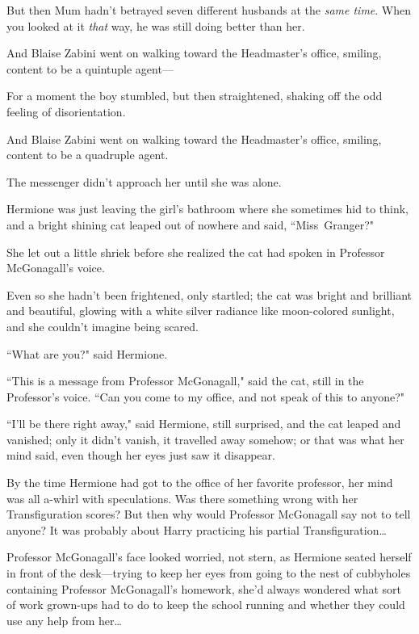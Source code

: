 But then Mum hadn't betrayed seven different husbands at the \emph{same time}. When you looked at it \emph{that} way, he was still doing better than her.

And Blaise Zabini went on walking toward the Headmaster's office, smiling, content to be a quintuple agent—

For a moment the boy stumbled, but then straightened, shaking off the odd feeling of disorientation.

And Blaise Zabini went on walking toward the Headmaster's office, smiling, content to be a quadruple agent.


The messenger didn't approach her until she was alone.

Hermione was just leaving the girl's bathroom where she sometimes hid to think, and a bright shining cat leaped out of nowhere and said, ``Miss~Granger?"

She let out a little shriek before she realized the cat had spoken in Professor McGonagall's voice.

Even so she hadn't been frightened, only startled; the cat was bright and brilliant and beautiful, glowing with a white silver radiance like moon-colored sunlight, and she couldn't imagine being scared.

``What are you?" said Hermione.

``This is a message from Professor McGonagall," said the cat, still in the Professor's voice. ``Can you come to my office, and not speak of this to anyone?"

``I'll be there right away," said Hermione, still surprised, and the cat leaped and vanished; only it didn't vanish, it travelled away somehow; or that was what her mind said, even though her eyes just saw it disappear.

By the time Hermione had got to the office of her favorite professor, her mind was all a-whirl with speculations. Was there something wrong with her Transfiguration scores? But then why would Professor McGonagall say not to tell anyone? It was probably about Harry practicing his partial Transfiguration{\ldots}

Professor McGonagall's face looked worried, not stern, as Hermione seated herself in front of the desk—trying to keep her eyes from going to the nest of cubbyholes containing Professor McGonagall's homework, she'd always wondered what sort of work grown-ups had to do to keep the school running and whether they could use any help from her{\ldots}

